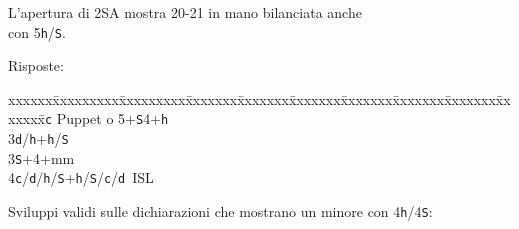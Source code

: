 \documentclass[a4paper,italian]{article}
\newcommand{\BS}{\small{\texttt{S}}}
\newcommand{\BC}{\small{\texttt{c}}}
\newcommand{\BD}{\small{\texttt{d}}}
\newcommand{\BH}{\small{\texttt{h}}}
\newenvironment{bidtable}
{\begin{tabbing}

    xxxxxx\=xxxxxxxxx\=xxxxxxxxx\=xxxxxxx\=xxxxxxx\=xxxxxxx\=xxxxxxx\=xxxxxxx\=xxxxxxx\=xxxxxxx\=\kill}
{\end{tabbing} }%
\newenvironment{sviluppi}
{\begin{tcolorbox}[colframe=azzurro,title=Sviluppi particolari]}
    {
\end{tcolorbox} }%
\begin{document}
\begin{multicols}{2}
    L'apertura di 2\small{SA} mostra 20-21 in mano bilanciata anche\\con 5\BH/\BS.

    Risposte:

    \begin{bidtable}
        3\BC\> Puppet o 5+\BS4+\BH\\
        3\BD/\BH{}+\BH/\BS\\
        3\BS{}+4+mm\\
        4\BC/\BD/\BH/\BS\>+\BH/\BS/\BC/\BD\ ISL\\
    \end{bidtable}

    \begin{sviluppi}
        Sviluppi validi sulle dichiarazioni che mostrano un minore con 4\BH/4\BS:


\end{sviluppi}
\end{multicols}
\end{document}
